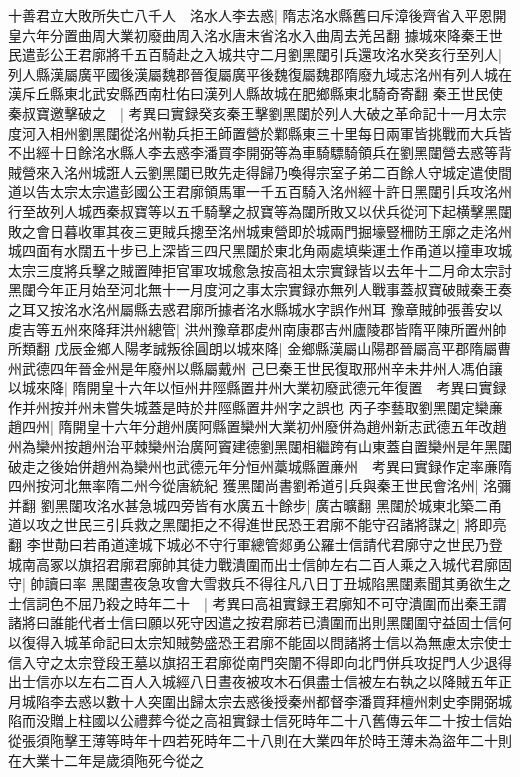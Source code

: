 十善君立大敗所失亡八千人　洺水人李去惑|{
	隋志洺水縣舊曰斥漳後齊省入平恩開皇六年分置曲周大業初廢曲周入洺水唐末省洺水入曲周去羌呂翻}
據城來降秦王世民遣彭公王君廓將千五百騎赴之入城共守二月劉黑闥引兵還攻洺水癸亥行至列人|{
	列人縣漢屬廣平國後漢屬魏郡晉復屬廣平後魏復屬魏郡隋廢九域志洺州有列人城在漢斥丘縣東北武安縣西南杜佑曰漢列人縣故城在肥鄉縣東北騎奇寄翻}
秦王世民使秦叔寶邀擊破之　|{
	考異曰實録癸亥秦王擊劉黑闥於列人大破之革命記十一月太宗度河入相州劉黑闥從洺州勒兵拒王師置營於鄴縣東三十里每日兩軍皆挑戰而大兵皆不出經十日餘洺水縣人李去惑李潘買李開弼等為車騎驃騎領兵在劉黑闥營去惑等背賊營來入洺州城誑人云劉黑闥已敗先走得歸乃喚得宗室子弟二百餘人守城定遣使間道以告太宗太宗遣彭國公王君廓領馬軍一千五百騎入洺州經十許日黑闥引兵攻洺州行至故列人城西秦叔寶等以五千騎擊之叔寶等為闥所敗又以伏兵從河下起横擊黑闥敗之會日暮收軍其夜三更賊兵摠至洺州城東營即於城兩門掘壕豎柵防王廓之走洺州城四面有水闊五十步已上深皆三四尺黑闥於東北角兩處填柴運土作甬道以撞車攻城太宗三度將兵擊之賊置陣拒官軍攻城愈急按高祖太宗實録皆以去年十二月命太宗討黑闥今年正月始至河北無十一月度河之事太宗實録亦無列人戰事蓋叔寶破賊秦王奏之耳又按洺水洺州屬縣去惑君廓所據者洺水縣城水字誤作州耳}
豫章賊帥張善安以䖍吉等五州來降拜洪州總管|{
	洪州豫章郡䖍州南康郡吉州廬陵郡皆隋平陳所置州帥所類翻}
戊辰金鄉人陽孝誠叛徐圓朗以城來降|{
	金鄉縣漢屬山陽郡晉屬高平郡隋屬曹州武德四年晉金州是年廢州以縣屬戴州}
己巳秦王世民復取邢州辛未井州人馮伯讓以城來降|{
	隋開皇十六年以恒州井陘縣置井州大業初廢武德元年復置　考異曰實録作并州按并州未嘗失城蓋是時於井陘縣置井州字之誤也}
丙子李藝取劉黑闥定欒亷趙四州|{
	隋開皇十六年分趙州廣阿縣置欒州大業初州廢併為趙州新志武德五年改趙州為欒州按趙州治平棘欒州治廣阿竇建德劉黑闥相繼跨有山東蓋自置欒州是年黑闥破走之後始併趙州為欒州也武德元年分恒州藁城縣置亷州　考異曰實録作定率亷隋四州按河北無率隋二州今從唐統紀}
獲黑闥尚書劉希道引兵與秦王世民會洺州|{
	洺彌并翻}
劉黑闥攻洺水甚急城四旁皆有水廣五十餘步|{
	廣古曠翻}
黑闥於城東北築二甬道以攻之世民三引兵救之黑闥拒之不得進世民恐王君廓不能守召諸將謀之|{
	將即亮翻}
李世勣曰若甬道達城下城必不守行軍總管郯勇公羅士信請代君廓守之世民乃登城南高冢以旗招君廓君廓帥其徒力戰潰圍而出士信帥左右二百人乘之入城代君廓固守|{
	帥讀曰率}
黑闥晝夜急攻會大雪救兵不得往凡八日丁丑城陷黑闥素聞其勇欲生之士信詞色不屈乃殺之時年二十　|{
	考異曰高祖實録王君廓知不可守潰圍而出秦王謂諸將曰誰能代者士信曰願以死守因遣之按君廓若已潰圍而出則黑闥圍守益固士信何以復得入城革命記曰太宗知賊勢盛恐王君廓不能固以問諸將士信以為無慮太宗使士信入守之太宗登段王墓以旗招王君廓從南門突闈不得即向北門併兵攻捉門人少退得出士信亦以左右二百人入城經八日晝夜被攻木石俱盡士信被左右執之以降賊五年正月城陷李去惑以數十人突圍出歸太宗去惑後授秦州都督李潘買拜檀州刺史李開弼城陷而没贈上柱國以公禮葬今從之高祖實録士信死時年二十八舊傳云年二十按士信始從張須陁擊王薄等時年十四若死時年二十八則在大業四年於時王薄未為盜年二十則在大業十二年是歲須陁死今從之}
